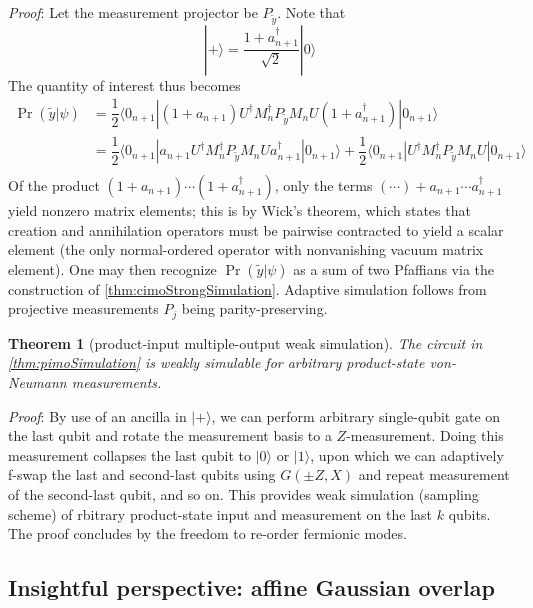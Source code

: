 \documentclass[
]{book}
\newtheorem{theorem}{Theorem}[chapter]
\theoremstyle{definition}
\theoremstyle{definition}
\theoremstyle{definition}
\theoremstyle{definition}
\theoremstyle{remark}
\begin{document}
\emph{Proof}: Let the measurement projector be \(P_{\tilde y}\). Note that
\[ 
    |+\rangle= \dfrac{1+a_{n+1}^\dagger} {\sqrt 2}|0\rangle
\]
The quantity of interest thus becomes
\begin{equation}\begin{aligned}
    \Pr(\tilde y|\psi) 
    &= \dfrac 1 2 \langle 0_{n+1}|(1+a_{n+1})U^\dagger M_n^\dagger P_{\tilde y}M_n U(1+a_{n+1}^\dagger)|0_{n+1}\rangle\\ 
    &= \dfrac 1 2 \langle 0_{n+1}|a_{n+1}U^\dagger M_n^\dagger P_{\tilde y}M_n Ua_{n+1}^\dagger|0_{n+1}\rangle
    + \dfrac 1 2 \langle 0_{n+1}|U^\dagger M_n^\dagger P_{\tilde y}M_n U|0_{n+1}\rangle\\ 
\end{aligned}\label{eq:simulationProb}\end{equation}
Of the product \((1+a_{n+1})\cdots (1+a_{n+1}^\dagger)\), only the terms
\((\cdots)+a_{n+1}\cdots a_{n+1}^\dagger\) yield nonzero matrix elements; this is
by Wick's theorem, which states that creation and annihilation operators must be
pairwise contracted to yield a scalar element (the only normal-ordered operator
with nonvanishing vacuum matrix element).
One may then recognize \(\Pr(\tilde y|\psi)\) as a sum of two Pfaffians via
the construction of \ref{thm:cimoStrongSimulation}. Adaptive simulation follows
from projective measurements \(P_j\) being parity-preserving.

\begin{theorem}[product-input multiple-output weak simulation]
\protect\hypertarget{thm:pimoweakSimulation}{}\label{thm:pimoweakSimulation}The circuit in \ref{thm:pimoSimulation}
is weakly simulable for arbitrary product-state von-Neumann measurements.
\end{theorem}

\emph{Proof}: By use of an ancilla in \(|+\rangle\), we can perform arbitrary single-qubit
gate on the last qubit and rotate the measurement basis to a \(Z\)-measurement.
Doing this measurement collapses the last qubit to \(|0\rangle\) or \(|1\rangle\), upon which
we can adaptively f-swap the last and second-last qubits using \(G(\pm Z, X)\)
and repeat measurement of the second-last qubit, and so on.
This provides weak simulation (sampling scheme) of
rbitrary product-state input and measurement
on the last \(k\) qubits. The proof concludes by
the freedom to re-order fermionic modes.

\subsection{Insightful perspective: affine Gaussian overlap}\label{insightful-perspective-affine-gaussian-overlap}
\end{document}
